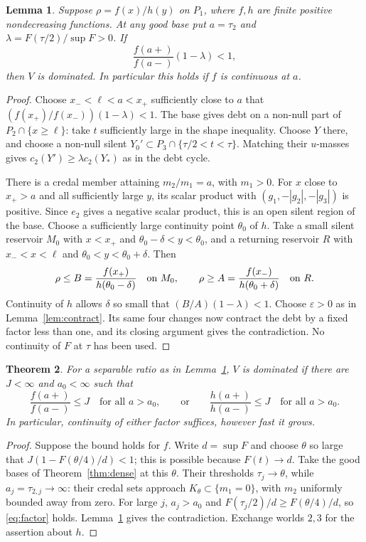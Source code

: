 \documentclass[11pt]{article}
\newtheorem{theorem}{Theorem}
\newtheorem{lemma}[theorem]{Lemma}
\theoremstyle{remark}\newtheorem{remark}[theorem]{Remark}
\begin{document}
\begin{lemma}\label{lem:factor}
Suppose $\rho=f(x)/h(y)$ on $P_1$, where $f,h$ are finite positive
nondecreasing functions. At any good base put $a=\tau_2$ and
$\lambda=F(\tau/2)/\sup F>0$. If
\[
 \frac{f(a+)}{f(a-)}(1-\lambda)<1,
 \tag{**}\label{eq:factor}
\]
then $V$ is dominated. In particular this holds if $f$ is continuous at $a$.
\end{lemma}
\begin{proof}
Choose $x_-<\ell<a<x_+$ sufficiently close to $a$ that
$(f(x_+)/f(x_-))(1-\lambda)<1$. The base gives debt on a non-null part
of $P_2\cap\{x\ge\ell\}$: take $t$ sufficiently large in the shape
inequality. Choose $Y$ there, and choose a non-null silent
$Y_0'\subset P_3\cap\{\tau/2<t<\tau\}$. Matching their $u$-masses gives
$c_2(Y')\ge\lambda c_2(Y_*)$ as in the debt cycle.

There is a credal member attaining $m_2/m_1=a$, with $m_1>0$.
For $x$ close to $x_+>a$ and all sufficiently large $y$, its scalar
product with $(g_1,-|g_2|,-|g_3|)$ is positive. Since $e_2$ gives a
negative scalar product, this is an open silent region of the base.
Choose a sufficiently large continuity point $\theta_0$ of $h$.
Take a small silent reservoir $M_0$ with $x<x_+$ and
$\theta_0-\delta<y<\theta_0$, and a returning reservoir $R$ with
$x_-<x<\ell$ and $\theta_0<y<\theta_0+\delta$. Then
\[
 \rho\le B=\frac{f(x_+)}{h(\theta_0-\delta)}\quad\hbox{on }M_0,
 \qquad
 \rho\ge A=\frac{f(x_-)}{h(\theta_0+\delta)}\quad\hbox{on }R.
\]
Continuity of $h$ allows $\delta$ so small that $(B/A)(1-\lambda)<1$.
Choose $\varepsilon>0$ as in Lemma~\ref{lem:contract}. Its same four
changes now contract the debt by a fixed factor less than one, and its
closing argument gives the contradiction. No continuity of $F$ at $\tau$
has been used.
\end{proof}

\begin{theorem}\label{thm:factor}
For a separable ratio as in Lemma~\ref{lem:factor}, $V$ is dominated if
there are $J<\infty$ and $a_0<\infty$ such that
\[
 \frac{f(a+)}{f(a-)}\le J\quad\text{for all }a>a_0,
 \qquad\text{or}\qquad
 \frac{h(a+)}{h(a-)}\le J\quad\text{for all }a>a_0.
\]
In particular, continuity of either factor suffices, however fast it grows.
\end{theorem}
\begin{proof}
Suppose the bound holds for $f$. Write $d=\sup F$ and choose $\theta$ so
large that $J(1-F(\theta/4)/d)<1$; this is possible because $F(t)\to d$.
Take the good bases of Theorem~\ref{thm:dense} at this $\theta$.
Their thresholds $\tau_j\to\theta$, while $a_j=\tau_{2,j}\to\infty$:
their credal sets approach $K_\theta\subset\{m_1=0\}$, with $m_2$
uniformly bounded away from zero. For large $j$, $a_j>a_0$ and
$F(\tau_j/2)/d\ge F(\theta/4)/d$, so \eqref{eq:factor} holds.
Lemma~\ref{lem:factor} gives the contradiction. Exchange worlds $2,3$
for the assertion about $h$.
\end{proof}
\end{document}
